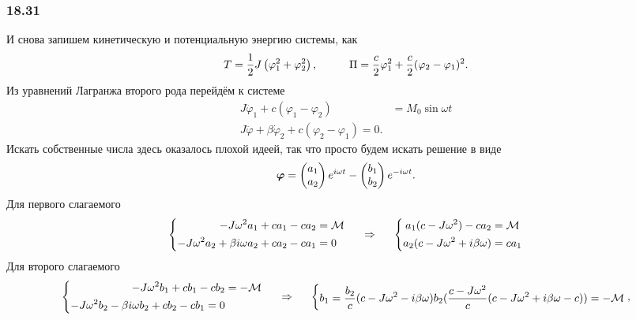 \subsubsection*{18.31}


И снова запишем кинетическую и потенциальную энергию системы, как
\begin{equation*}
    T = \frac{1}{2} J \left(\varphi_1^2 + \varphi_2^2\right),
    \hspace{1 cm}
    \Pi = \frac{c}{2} \varphi_1^2 + \frac{c}{2}(\varphi_2 - \varphi_1)^2.
\end{equation*}
Из уравнений Лагранжа второго рода перейдём к системе
\begin{align*}
    J \ddot{\varphi}_1 + c(\varphi_1 - \varphi_2) &= M_0 \sin \omega t\\
    J \ddot{\varphi} + \beta \dot{\varphi}_2 + c (\varphi_2 - \varphi_1) = 0.
\end{align*}
Искать собственные числа здесь оказалось плохой идеей, так что просто будем искать решение в виде
\begin{equation*}
    \mbox{\boldmath $\varphi$} = \begin{pmatrix}
        a_1 \\ a_2
    \end{pmatrix} e^{i\omega t} - 
    \begin{pmatrix}
        b_1 \\ b_2
    \end{pmatrix} e^{-i\omega t}.
\end{equation*}
Для первого слагаемого
\begin{equation*}
    \left\{\begin{aligned}
        - J \omega^2 a_1 + c a_1 - c a_2 &= \mathcal M \\
        - J \omega^2 a_2 + \beta i \omega a_2 + c a_2 - c a_1 &= 0
    \end{aligned}\right.
    \hspace{0.5cm} \Rightarrow \hspace{0.5cm}
    \left\{\begin{aligned}
        a_1 (c - J \omega^2) - c a_2 &= \mathcal M \\
        a_2 (c - J \omega^2 + i \beta \omega) &= c a_1
    \end{aligned}\right.
\end{equation*}
Для второго слагаемого
\begin{equation*}
    \left\{\begin{aligned}
        - J \omega^2 b_1 + c b_1 - c b_2 &= - \mathcal M \\
        - J \omega^2 b_2 - \beta i \omega b_2 + c b_2 - c b_1 = 0
    \end{aligned}\right.
    \hspace{0.5cm} \Rightarrow \hspace{0.5cm}
    \left\{\begin{aligned}
        b_1 = \frac{b_2}{c} (c - J \omega^2 - i \beta \omega)
        b_2 (\frac{c - J \omega^2}{c} (c - J \omega^2 + i \beta \omega - c)) = - \mathcal M
    \end{aligned}\right.
    ,
\end{equation*}
